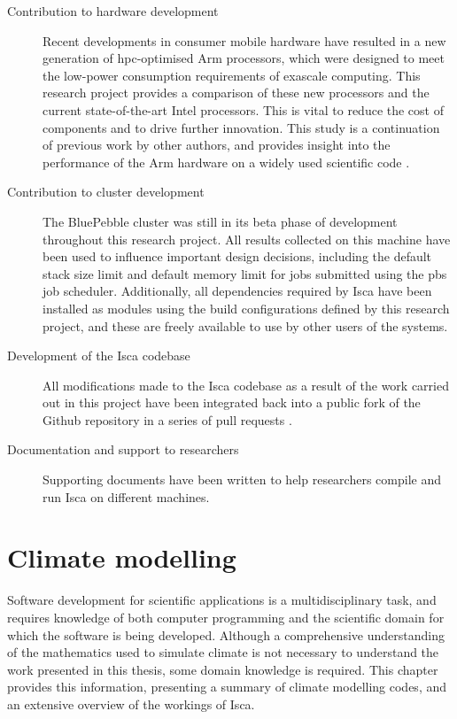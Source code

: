 \documentclass[a4paper,11pt]{report}
\begin{document}
\begin{description}
	\item[Contribution to hardware development] Recent developments in consumer mobile hardware have resulted in a new generation of \gls{hpc}-optimised Arm processors, which were designed to meet the low-power consumption requirements of exascale computing. This research project provides a comparison of these new processors and the current state-of-the-art Intel processors. This is vital to reduce the cost of components and to drive further innovation. This study is a continuation of previous work by other authors, and provides insight into the performance of the Arm hardware on a widely used scientific code \cite{mcintosh2018performance}.
	
	\item[Contribution to cluster development] The BluePebble cluster was still in its beta phase of development throughout this research project. All results collected on this machine have been used to influence important design decisions, including the default stack size limit and default memory limit for jobs submitted using the \gls{pbs} job scheduler. Additionally, all dependencies required by Isca have been installed as modules using the build configurations defined by this research project, and these are freely available to use by other users of the systems. 
	
	\item[Development of the Isca codebase] All modifications made to the Isca codebase as a result of the work carried out in this project have been integrated back into a public fork of the Github repository in a series of pull requests \cite{isca2019github}. 
	
	\item[Documentation and support to researchers] Supporting documents have been written to help researchers compile and run Isca on different machines.
	
\end{description}

\chapter{Climate modelling}
\label{chap:background}
Software development for scientific applications is a multidisciplinary task, and requires knowledge of both computer programming and the scientific domain for which the software is being developed. Although a comprehensive understanding of the mathematics used to simulate climate is not necessary to understand the work presented in this thesis, some domain knowledge is required. This chapter provides this information, presenting a summary of climate modelling codes, and an extensive overview of the workings of Isca.
\end{document}
